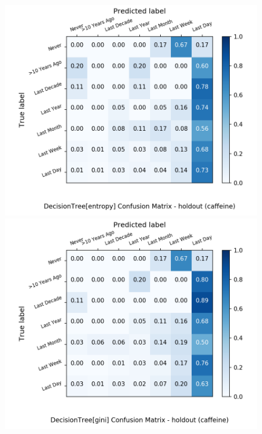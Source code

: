 \begin{figure}[H]
	\centering
	\begin{minipage}[b]{0.32\textwidth}
		\includegraphics[width=1.1\textwidth]{Plots/drugs/caffeine_DecisionTree_entropy_balance_False_holdout.png}
	\end{minipage}
	\begin{minipage}[b]{0.32\textwidth}
		\includegraphics[width=1.1\textwidth]{Plots/drugs/caffeine_DecisionTree_gini_balance_False_holdout.png}
	\end{minipage}

\end{figure}

